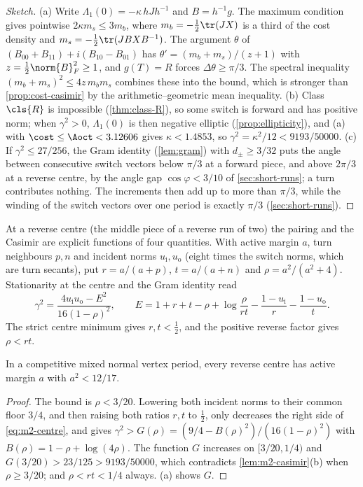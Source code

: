 \begin{proof}[Sketch]
(a) Write $\Lambda_1(0)=-\kappa\,hJh^{-1}$ and $B=h^{-1}g$. The maximum condition gives pointwise
$2\kappa m_s\le 3m_b$, where $m_b=-\frac12\tr(JX)$ is a third of the cost density and
$m_s=-\frac12\tr(JBXB^{-1})$. The argument $\theta$ of $(B_{00}+B_{11})+i(B_{10}-B_{01})$ has
$\theta'=(m_b+m_s)/(z+1)$ with $z=\frac12\norm{B}_F^2\ge1$, and $g(T)=R$ forces
$\Delta\theta\ge\pi/3$. The spectral inequality $(m_b+m_s)^2\le 4z\,m_bm_s$ combines these into the
bound, which is stronger than \cref{prop:cost-casimir} by the arithmetic--geometric mean inequality.
(b) Class $\cls{R}$ is impossible (\cref{thm:class-R}), so some switch is forward and has positive
norm; when $\gamma^2>0$, $\Lambda_1(0)$ is then negative elliptic (\cref{prop:ellipticity}), and
(a) with $\cost\le\Aoct<3.12606$ gives $\kappa<1.4853$, so $\gamma^2=\kappa^2/12<9193/50000$.
(c) If $\gamma^2\le 27/256$, the Gram identity (\cref{lem:gram}) with $d_\pm\ge3/32$ puts the angle
between consecutive switch vectors below $\pi/3$ at a forward piece, and above $2\pi/3$ at a reverse
centre, by the angle gap $\cos\varphi<3/10$ of \cref{sec:short-runs}; a turn
contributes nothing. The increments then add up to more than $\pi/3$, while the winding of the switch
vectors over one period is exactly $\pi/3$ (\cref{sec:short-runs}).
\end{proof}

At a reverse centre (the middle piece of a reverse run of two) the pairing and the Casimir are
explicit functions of four quantities. With active margin $a$, turn neighbours $p,n$ and incident
norms $u_{\mathrm i},u_{\mathrm o}$ (eight times the switch norms, which are turn secants), put
$r=a/(a+p)$, $t=a/(a+n)$ and $\rho=a^2/(a^2+4)$. Stationarity at the centre and the Gram identity
read
\begin{equation}\label{eq:m2-centre}
\gamma^2=\frac{4u_{\mathrm i}u_{\mathrm o}-E^2}{16(1-\rho)^2},\qquad
E=1+r+t-\rho+\log\frac{\rho}{rt}-\frac{1-u_{\mathrm i}}{r}-\frac{1-u_{\mathrm o}}{t}.
\end{equation}
The strict centre minimum gives $r,t<\frac12$, and the positive reverse factor gives $\rho<rt$.

\begin{lemma}\label{lem:m2-scale}
In a competitive mixed normal vertex period, every reverse centre has active margin $a$ with
$a^2<12/17$.
\end{lemma}

\begin{proof}
The bound is $\rho<3/20$. Lowering both incident norms to their common floor $3/4$, and then raising
both ratios $r,t$ to $\frac12$, only decreases the right side of \eqref{eq:m2-centre}, and gives
$\gamma^2>G(\rho)=(9/4-B(\rho)^2)/(16(1-\rho)^2)$ with $B(\rho)=1-\rho+\log(4\rho)$. The function
$G$ increases on $[3/20,1/4)$ and $G(3/20)>23/125>9193/50000$, which contradicts
\cref{lem:m2-casimir}(b) when $\rho\ge3/20$; and $\rho<rt<1/4$ always.
(a) shows $G$.
\end{proof}

